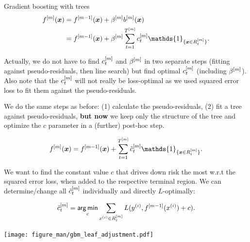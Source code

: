 \begin{vbframe}{Gradient boosting with trees}
\begin{align*}
  \fm(\xv) &= \fmd(\xv) +  \betam \bmm(\xv) \\
         &= \fmd(\xv) +  \betam \sum_{t=1}^{\Tm} \ctm \mathds{1}_{\{\xv \in \Rtm\}}.
\end{align*}

Actually, we do not have to find $c_t^{[m]}$ and $\beta^{[m]}$ in two separate steps
(fitting against pseudo-residuals, then line search) but find optimal $c_t^{[m]}$ (including $\beta^{[m]}$).
Also note that the $c_t^{[m]}$ will not really be loss-optimal as we used squared error loss
to fit them against the pseudo-residuals.

\framebreak
\begin{footnotesize}
We do the same steps as before: (1) calculate the pseudo-residuals, (2) fit a tree against pseudo-residuals, \textbf{but now} we keep only the structure of the tree and optimize the $c$ parameter in a (further) post-hoc step.

$$
\fm(\xv) = \fmd(\xv) +  \sum_{t=1}^{\Tm} \ctmt \mathds{1}_{\{\xv \in \Rtm\}}. 
$$

We want to find the constant value $c$ that drives down risk the most w.r.t the squared error loss,
when added to the respective terminal region.
We can determine/change all $\tilde{c}_t^{[m]}$ individually and directly $L$-optimally:



$$ \tilde{c}_t^{[m]} = \mathop{\sf arg\,min}_{c} \sum_{x^{(i)} \in R_{t}^{[m]}} L(y^{(i)}, f^{[m-1]}(x^{(i)}) + c). $$

\vspace{-0.5cm}

\begin{center}

\texttt{[image: figure\_man/gbm\_leaf\_adjustment.pdf]}

\end{center}

\end{footnotesize}

\framebreak



\end{vbframe}



